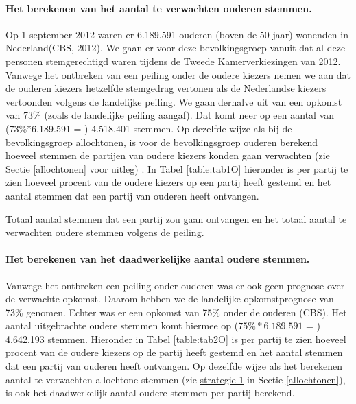 \paragraph{Het berekenen van het aantal te verwachten ouderen stemmen.}
Op 1 september 2012 waren er 6.189.591 ouderen (boven de 50 jaar) wonenden in Nederland(CBS, 2012). We gaan er voor deze bevolkingsgroep vanuit dat al deze personen stemgerechtigd waren tijdens de Tweede Kamerverkiezingen van 2012. Vanwege het ontbreken van een peiling onder de oudere kiezers nemen we aan dat de ouderen kiezers hetzelfde stemgedrag vertonen als de Nederlandse kiezers vertoonden volgens de landelijke peiling. We gaan derhalve uit van een opkomst van 73\% (zoals de landelijke peiling aangaf). Dat komt neer op een aantal van (73\%*6.189.591 = ) 4.518.401 stemmen. Op dezelfde wijze als bij de bevolkingsgroep allochtonen, is voor de bevolkingsgroep ouderen berekend hoeveel stemmen de partijen van oudere kiezers konden gaan verwachten (zie Sectie \ref{allochtonen} voor uitleg) . In Tabel \ref{table:tab1O} hieronder is per partij te zien hoeveel procent van de oudere kiezers op een partij heeft gestemd en het aantal stemmen dat een partij van ouderen heeft ontvangen.


\begin{table}[H]
\centering
	\begin{footnotesize}
		
	\end{footnotesize}
			\caption{Totaal aantal stemmen dat een partij zou gaan ontvangen en het totaal aantal te verwachten oudere stemmen volgens de peiling.}
\label{table:tab1O} 
\end{table}


\paragraph{Het berekenen van het daadwerkelijke aantal oudere stemmen.}
Vanwege het ontbreken een peiling onder ouderen was er ook geen prognose over de verwachte opkomst. Daarom hebben we de landelijke opkomstprognose van 73\% genomen. Echter was er een opkomst van 75\% onder de ouderen (CBS). Het aantal uitgebrachte oudere stemmen komt hiermee op ($75\%*6.189.591$ = ) 4.642.193 stemmen. Hieronder in Tabel \ref{table:tab2O} is per partij te zien hoeveel procent van de oudere kiezers op de partij heeft gestemd en het aantal stemmen dat een partij van ouderen heeft ontvangen. Op dezelfde wijze als het berekenen aantal te verwachten allochtone stemmen (zie \hyperref[S1A]{strategie 1} in Sectie \ref{allochtonen}), is ook het daadwerkelijk aantal oudere stemmen per partij berekend. 
    

